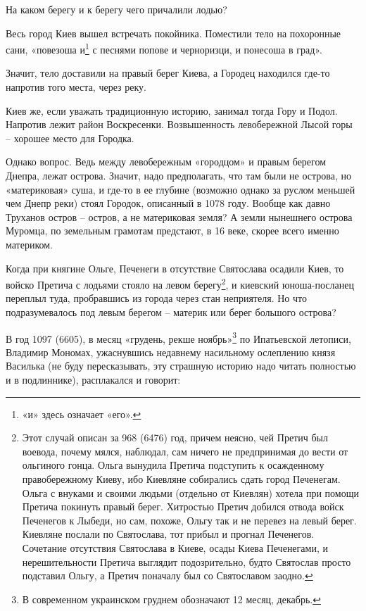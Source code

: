 На каком берегу и к берегу чего причалили лодью?

Весь город Киев вышел встречать покойника. Поместили тело на похоронные сани, «повезоша и\footnote{«и» здесь означает «его».} с песнями попове и черноризци, и понесоша в град».

Значит, тело доставили на правый берег Киева, а Городец находился где-то напротив того места, через реку.

Киев же, если уважать традиционную историю, занимал тогда Гору и Подол. Напротив лежит район Воскресенки. Возвышенность левобережной Лысой горы – хорошее место для Городка.

Однако вопрос. Ведь между левобережным «городцом» и правым берегом Днепра, лежат острова. Значит, надо предполагать, что там были не острова, но «материковая» суша, и где-то в ее глубине (возможно однако за руслом меньшей чем Днепр реки) стоял Городок, описанный в 1078 году. Вообще как давно Труханов остров – остров, а не материковая земля? А земли нынешнего острова Муромца, по земельным грамотам предстают, в 16 веке, скорее всего именно материком.

Когда при княгине Ольге, Печенеги в отсутствие Святослава осадили Киев, то войско Претича с лодьями стояло на левом берегу\footnote{Этот случай описан за 968 (6476) год, причем неясно, чей Претич был воевода, почему мялся, наблюдал, сам ничего не предпринимая до вести от ольгиного гонца. Ольга вынудила Претича подступить к осажденному правобережному Киеву, ибо Киевляне собирались сдать город Печенегам. Ольга с внуками и своими людьми (отдельно от Киевлян) хотела при помощи Претича покинуть правый берег. Хитростью Претич добился отвода войск Печенегов к Лыбеди, но сам, похоже, Ольгу так и не перевез на левый берег. Киевляне послали по Святослава, тот прибыл и прогнал Печенегов. Сочетание отсутствия Святослава в Киеве, осады Киева Печенегами, и нерешительности Претича выглядит подозрительно, будто Святослав просто подставил Ольгу, а Претич поначалу был со Святославом заодно.}, и киевский юноша-посланец переплыл туда, пробравшись из города через стан неприятеля. Но что подразумевалось под левым берегом – материк или берег большого острова?

В год 1097 (6605), в месяц «грудень, рекше ноябрь»\footnote{В современном украинском груднем обозначают 12 месяц, декабрь.} по Ипатьевской летописи, Владимир Мономах, ужаснувшись недавнему насильному ослеплению князя Василька (не буду пересказывать, эту страшную историю надо читать полностью и в подлиннике), расплакался и говорит:

